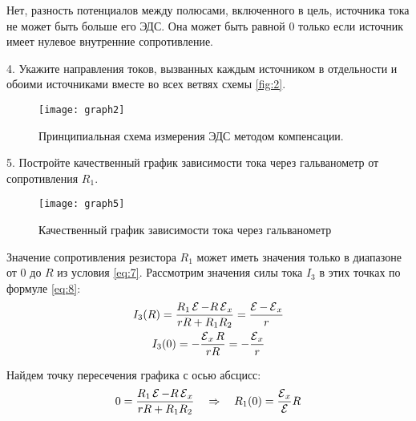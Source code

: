 Нет, разность потенциалов между полюсами, включенного в цель, источника тока не может быть больше его ЭДС. Она может быть равной 0 только если источник имеет нулевое внутренние сопротивление.


\begin{librarybox}
	4. Укажите направления токов, вызванных каждым источником в отдельности и обоими источниками вместе во всех ветвях схемы \cref{fig:2}.
\end{librarybox}
\begin{figure}[H]
	\centering
	\texttt{[image: graph2]}
	\caption{Принципиальная схема измерения ЭДС методом компенсации.}
	\label{fig:6}
\end{figure}


\begin{librarybox}
	5. Постройте качественный график зависимости тока через гальванометр от сопротивления $R_1$.
\end{librarybox}

\begin{figure}[H]
	\centering
	\texttt{[image: graph5]}
	\caption{Качественный график зависимости тока через гальванометр}
	\label{fig:7}
\end{figure}

Значение сопротивления резистора $R_1$ может иметь значения только в диапазоне от $0$ до $R$ из условия \cref{eq:7}. Рассмотрим значения силы тока $I_3$ в этих точках по формуле \cref{eq:8}:
\begin{gather}
	I_3(R) = \frac{R_1\operatorname{\mathcal{E}} - R \operatorname{\mathcal{E}}_x}{rR+R_1R_2} = \frac{\operatorname{\mathcal{E}} - \operatorname{\mathcal{E}}_x}{r}\\
	I_3(0) = -\frac{\operatorname{\mathcal{E}}_x R}{rR} = -\frac{\operatorname{\mathcal{E}}_x}{r}
\end{gather}

Найдем точку пересечения графика с осью абсцисс:
\begin{align}
	0 = \dfrac{R_1 \operatorname{\mathcal{E}} - R \operatorname{\mathcal{E}}_x}{r R + R_1 R_2} \quad\Rightarrow\quad R_1(0) = \frac{\operatorname{\mathcal{E}}_x}{\operatorname{\mathcal{E}}}R
\end{align}

